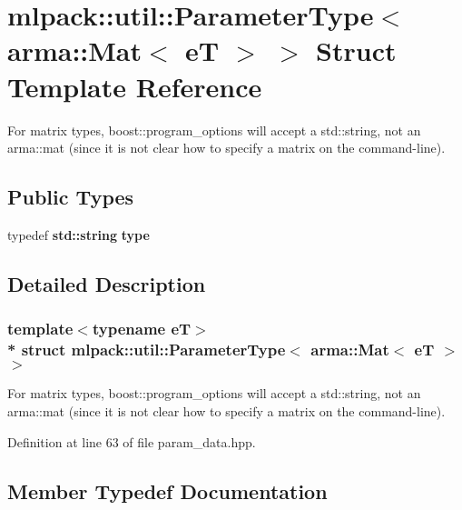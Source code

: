 \section{mlpack\+:\+:util\+:\+:Parameter\+Type$<$ arma\+:\+:Mat$<$ eT $>$ $>$ Struct Template Reference}
\label{structmlpack_1_1util_1_1ParameterType_3_01arma_1_1Mat_3_01eT_01_4_01_4}


For matrix types, boost\+::program\+\_\+options will accept a std\+::string, not an arma\+::mat (since it is not clear how to specify a matrix on the command-\/line).  


\subsection*{Public Types}
\begin{DoxyCompactItemize}
\item 
typedef {\bf std\+::string} {\bf type}
\end{DoxyCompactItemize}


\subsection{Detailed Description}
\subsubsection*{template$<$typename eT$>$\\*
struct mlpack\+::util\+::\+Parameter\+Type$<$ arma\+::\+Mat$<$ e\+T $>$ $>$}

For matrix types, boost\+::program\+\_\+options will accept a std\+::string, not an arma\+::mat (since it is not clear how to specify a matrix on the command-\/line). 

Definition at line 63 of file param\+\_\+data.\+hpp.



\subsection{Member Typedef Documentation}
